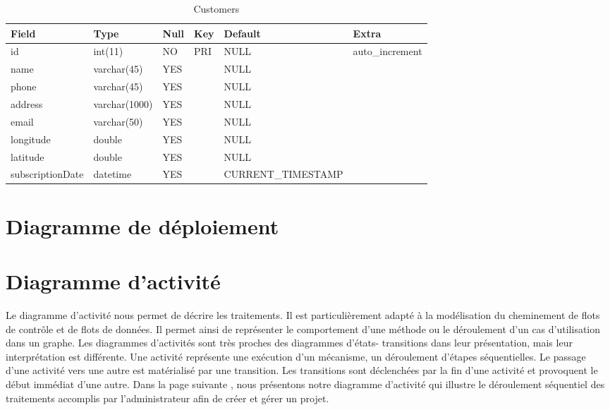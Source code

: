 \begin{itemize}
\begin{table}
\begin{tabular}{|l|l|l|l|l|l|}
\hline
Field            & Type          & Null & Key & Default            & Extra            \\
\hline
id               & int(11)       & NO   & PRI & NULL               & auto\_increment  \\
\hline
name             & varchar(45)   & YES  &     & NULL               &                  \\
\hline
phone            & varchar(45)   & YES  &     & NULL               &                  \\
\hline
address          & varchar(1000) & YES  &     & NULL               &                  \\
\hline
email            & varchar(50)   & YES  &     & NULL               &                  \\
\hline
longitude        & double        & YES  &     & NULL               &                  \\
\hline
latitude         & double        & YES  &     & NULL               &                  \\
\hline
subscriptionDate & datetime      & YES  &     & CURRENT\_TIMESTAMP &                  \\
\hline
\end{tabular}
\centering
\caption{Customers}
\end{table}
\end{itemize}


\section{Diagramme de d\'{e}ploiement }


\section{Diagramme d'activit\'{e}}
Le diagramme d'activit\'{e} nous permet de d\'{e}crire les traitements. Il est
particuli\`{e}rement adapt\'{e} \`{a} la mod\'{e}lisation du cheminement de flots de
contr\^{o}le et de flots de donn\'{e}es. Il permet ainsi de repr\'{e}senter le
comportement d'une m\'{e}thode ou le d\'{e}roulement d'un cas d'utilisation dans
un graphe.
Les diagrammes d'activit\'{e}s sont tr\`{e}s proches des diagrammes d'\'{e}tats-
transitions dans leur pr\'{e}sentation, mais leur interpr\'{e}tation est diff\'{e}rente.
Une activit\'{e} repr\'{e}sente une ex\'{e}cution d'un m\'{e}canisme, un d\'{e}roulement
d'\'{e}tapes s\'{e}quentielles. Le passage d'une activit\'{e} vers une autre est mat\'{e}rialis\'{e}
par une transition.
Les transitions sont d\'{e}clench\'{e}es par la fin d'une activit\'{e} et provoquent le
d\'{e}but imm\'{e}diat d'une autre.
Dans la page suivante , nous pr\'{e}sentons notre diagramme d'activit\'{e} qui illustre le
d\'{e}roulement s\'{e}quentiel des traitements accomplis par l'administrateur afin de
cr\'{e}er et g\'{e}rer un projet.



